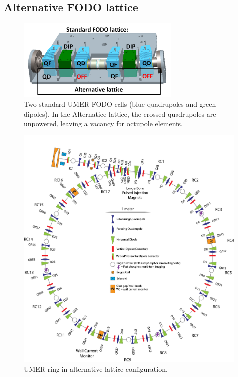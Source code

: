 \subsection{Alternative FODO lattice}

\begin{figure}[]
   \centering
   \includegraphics[width=0.7\textwidth]{6.figures/UMER_FODO.png}
   \caption{Two standard UMER FODO cells (blue quadrupoles and green dipoles). In the Alternatice lattice, the crossed quadrupoles are unpowered, leaving a vacancy for octupole elements.}
   \label{fig:FODOcell}
\end{figure}

\begin{figure}[]
   \centering
   \includegraphics[width=\textwidth]{umer-diagram/altlat_full_ring.png}
   \caption{UMER ring in alternative lattice configuration.}
   \label{fig:altlatring}
\end{figure}

